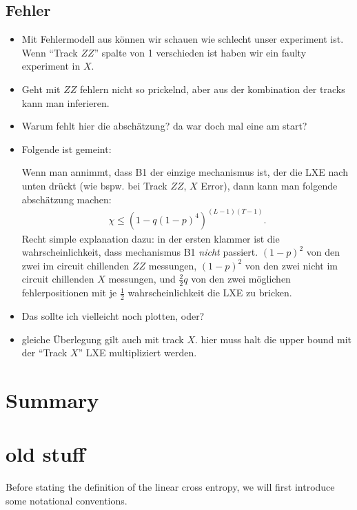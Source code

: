 \subsection{Fehler}\label{sec:lxe-errors}
\begin{itemize}
  \item Mit Fehlermodell aus \cite{tikhanovskayaUniversalityCrossEntropy2023}
    k\"onnen wir schauen wie schlecht unser experiment ist. Wenn
    \enquote{Track $ZZ$} spalte von 1 verschieden ist haben wir ein faulty
    experiment in $X$.
  \item Geht mit $ZZ$ fehlern nicht so prickelnd,%
    aber aus der kombination der tracks kann man inferieren. 
  \item Warum fehlt hier die absch\"atzung? da war doch mal eine am start?
  \item Folgende ist gemeint:

    Wenn man annimmt, dass \textsf{B1} der einzige mechanismus ist, der die LXE
    nach unten dr\"uckt (wie bspw. bei Track $ZZ$, $X$ Error), dann kann man
    folgende absch\"atzung machen:
    \begin{align}
      \chi \leq \left( 1-q\left( 1-p \right)^4  \right)^{(L-1)(T-1)}
    .\end{align}
    Recht simple explanation dazu: in der ersten klammer ist die
    wahrscheinlichkeit, dass mechanismus \textsf{B1} \emph{nicht} passiert.
    $\left( 1-p \right)^2$ von den zwei im circuit chillenden $ZZ$ messungen,
    $\left( 1-p \right)^2$ von den zwei nicht im circuit chillenden $X$
    messungen, und $\frac{2}{2} q$ von den zwei m\"oglichen fehlerpositionen
    mit je $\frac{1}{2}$ wahrscheinlichkeit die LXE zu bricken.

  \item Das sollte ich vielleicht noch plotten, oder?
  \item gleiche \"Uberlegung gilt auch mit track $X$. hier muss halt die upper
    bound mit der \enquote{Track $X$} LXE multipliziert werden.
\end{itemize}

\section{Summary}

\section{old stuff}
Before stating the definition of the linear cross entropy, we will first
introduce some notational conventions.

